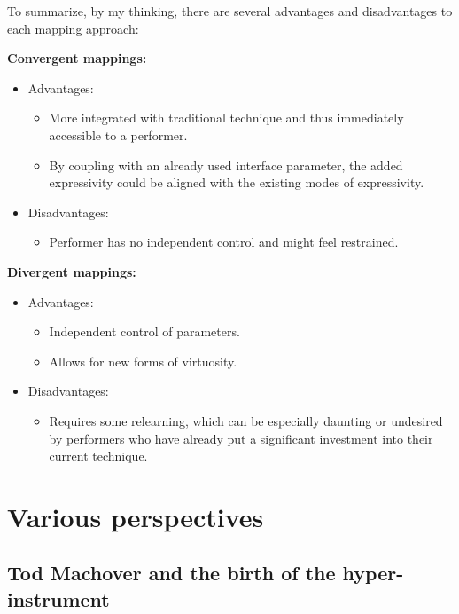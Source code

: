 \documentclass[12pt,twoside,maitrise]{dms_ks}
\theoremstyle{definition}
\begin{document}
{To summarize, by my thinking, there are several advantages and disadvantages to each mapping approach:

\textbf{Convergent mappings:}

\begin{itemize}
  \item Advantages:
  \begin{itemize}
    \item More integrated with traditional technique and thus immediately accessible to a performer.
    \item By coupling with an already used interface parameter, the added expressivity could be aligned with the existing modes of expressivity.
  \end{itemize}
  \item Disadvantages:
  \begin{itemize}
    \item Performer has no independent control and might feel restrained.
  \end{itemize}
\end{itemize}

\textbf{Divergent mappings:}

\begin{itemize}
  \item Advantages:
  \begin{itemize}
    \item Independent control of parameters.
    \item Allows for new forms of virtuosity.
  \end{itemize}
  \item Disadvantages:
  \begin{itemize}
    \item Requires some relearning, which can be especially daunting or undesired by performers who have already put a significant investment into their current technique.
  \end{itemize}
\end{itemize}

\section{Various perspectives}

\subsection{Tod Machover and the birth of the hyper-instrument}

}
\end{document}
